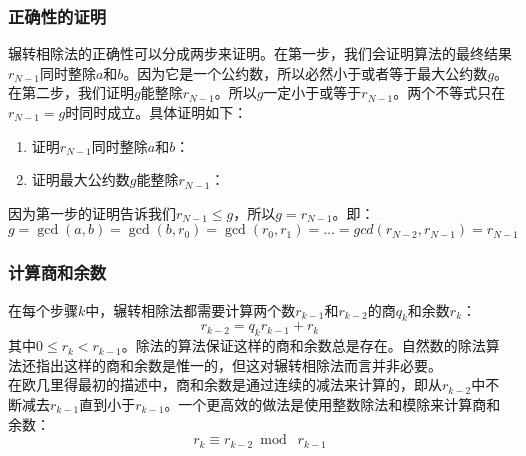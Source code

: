\documentclass[UTF8]{ctexart}
\begin{document}
\subsubsection*{正确性的证明}
辗转相除法的正确性可以分成两步来证明。在第一步，我们会证明算法的最终结果$r_{N−1}$同时整除$a$和$b$。因为它是一个公约数，所以必然小于或者等于最大公约数$g$。在第二步，我们证明$g$能整除$r_{N−1}$。所以$g$一定小于或等于$r_{N−1}$。两个不等式只在$r_{N−1} = g$时同时成立。具体证明如下：
\begin{enumerate}[1.]
    \item 证明$r_{N−1}$同时整除$a$和$b$：
    \item 证明最大公约数$g$能整除$r_{N-1}$：
\end{enumerate}
因为第一步的证明告诉我们$r_{N−1} \leq g$，所以$g = r_{N−1}$。即：
\[ g = \gcd(a,b) = \gcd(b,r_0) = \gcd(r_0,r_1) = \ldots = gcd(r_{N-2},r_{N-1}) = r_{N-1} \]
\subsubsection*{计算商和余数}
在每个步骤$k$中，辗转相除法都需要计算两个数$r_{k−1}$和$r_{k−2}$的商$q_k$和余数$r_k$：
\[ r_{k-2} = q_kr_{k-1} + r_k \]
其中$0 \leq r_k < r_{k−1}$。除法的算法保证这样的商和余数总是存在。自然数的除法算法还指出这样的商和余数是惟一的，但这对辗转相除法而言并非必要。\\
在欧几里得最初的描述中，商和余数是通过连续的减法来计算的，即从$r_{k−2}$中不断减去$r_{k−1}$直到小于$r_{k−1}$。一个更高效的做法是使用整数除法和模除来计算商和余数：
\[ r_k \equiv r_{k-2} \bmod\; r_{k-1} \]
\vfill
\end{document}
